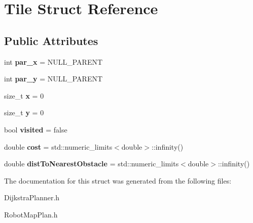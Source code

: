 \hypertarget{struct_tile}{}\section{Tile Struct Reference}
\label{struct_tile}
\subsection*{Public Attributes}
\begin{DoxyCompactItemize}
\item 
\mbox{\label{struct_tile_a20e3ddafa36638ac861fbf9990e35256}} 
int {\bfseries par\+\_\+x} = N\+U\+L\+L\+\_\+\+P\+A\+R\+E\+NT
\item 
\mbox{\label{struct_tile_abaa44785034b405ed6ea14acfb3acc8d}} 
int {\bfseries par\+\_\+y} = N\+U\+L\+L\+\_\+\+P\+A\+R\+E\+NT
\item 
\mbox{\label{struct_tile_a10adb366fa2b5495d600d6a3df3a72d7}} 
size\+\_\+t {\bfseries x} = 0
\item 
\mbox{\label{struct_tile_afc85e45b8ca73c4695246f1db67afc53}} 
size\+\_\+t {\bfseries y} = 0
\item 
\mbox{\label{struct_tile_a6fc86234519f692394d5c3214a220a0f}} 
bool {\bfseries visited} = false
\item 
\mbox{\label{struct_tile_ac8eb0dceee0e590242adc0011487f329}} 
double {\bfseries cost} = std\+::numeric\+\_\+limits$<$double$>$\+::infinity()
\item 
\mbox{\label{struct_tile_aa6f9e186846baeed9471dfdfa4d65bd7}} 
double {\bfseries dist\+To\+Nearest\+Obstacle} = std\+::numeric\+\_\+limits$<$double$>$\+::infinity()
\end{DoxyCompactItemize}


The documentation for this struct was generated from the following files\+:\begin{DoxyCompactItemize}
\item 
Dijkstra\+Planner.\+h\item 
Robot\+Map\+Plan.\+h\end{DoxyCompactItemize}
